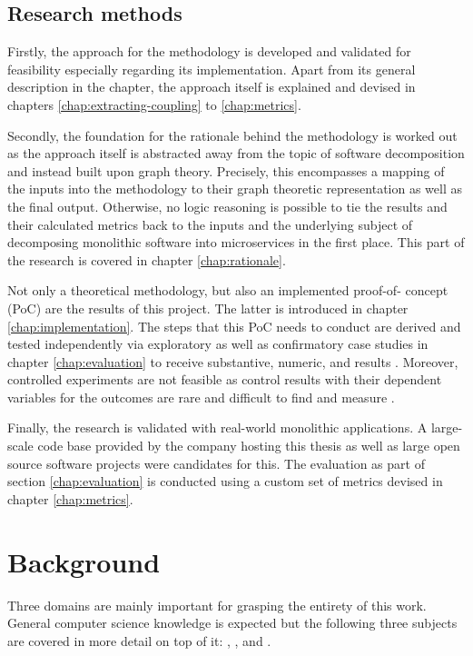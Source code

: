 \documentclass[12pt,a4paper]{report}
\begin{document}
\section{Research methods}

Firstly, the approach for the methodology is developed and validated for
feasibility especially regarding its implementation. Apart from its general
description in the \textit{} chapter, the approach itself
is explained and devised in chapters \ref{chap:extracting-coupling} to \ref{chap:metrics}.

Secondly, the foundation for the rationale behind the methodology is worked out
as the approach itself is abstracted away from the topic of software
decomposition and instead built upon graph theory. Precisely, this encompasses
a mapping of the inputs into the methodology to their graph theoretic
representation as well as the final output. Otherwise, no logic reasoning is
possible to tie the results and their calculated metrics back to the inputs and
the underlying subject of decomposing monolithic software into microservices in
the first place. This part of the research is covered in chapter \ref{chap:rationale}.

Not only a theoretical methodology, but also an implemented proof-of\hyp
concept (PoC) are the results of this project. The latter is introduced in
chapter \ref{chap:implementation}. The steps that this PoC needs to conduct are
derived and tested independently via exploratory as well as confirmatory case
studies in chapter \ref{chap:evaluation} to receive substantive, numeric, and
results \cite{easterbrook2008selecting}. Moreover, controlled
experiments are not feasible as control results with their dependent variables
for the outcomes are rare and difficult to find and measure
\cite{easterbrook2008selecting}.

Finally, the research is validated with real-world monolithic applications. A
large-scale code base provided by the company hosting this thesis as well as
large open source software projects were candidates for this. The evaluation as
part of section \ref{chap:evaluation} is conducted using a custom set of
metrics devised in chapter \ref{chap:metrics}.




\chapter{Background} \label{chap:background}

Three domains are mainly important for grasping the entirety of this work.
General computer science knowledge is expected but the following three subjects
are covered in more detail on top of it: \textit{},
\textit{}, and
\textit{}.
\end{document}

